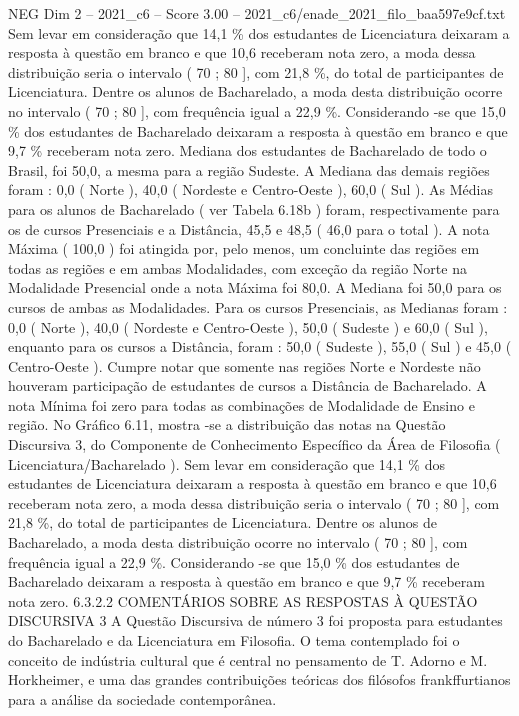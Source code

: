 \begin{textsample}{NEG Dim 2 – 2021\_c6 – Score 3.00 – 2021\_c6/enade\_2021\_filo\_baa597e9cf.txt}
Sem levar em consideração que 14,1 \% dos estudantes de Licenciatura deixaram a resposta à questão em branco e que 10,6 receberam nota zero, a moda dessa distribuição seria o intervalo ( 70 ; 80 ], com 21,8 \%, do total de participantes de Licenciatura.
Dentre os alunos de Bacharelado, a moda desta distribuição ocorre no intervalo ( 70 ; 80 ], com frequência igual a 22,9 \%.
Considerando -se que 15,0 \% dos estudantes de Bacharelado deixaram a resposta à questão em branco e que 9,7 \% receberam nota zero.
Mediana dos estudantes de Bacharelado de todo o Brasil, foi 50,0, a mesma para a região Sudeste.
A Mediana das demais regiões foram : 0,0 ( Norte ), 40,0 ( Nordeste e Centro-Oeste ), 60,0 ( Sul ).
As Médias para os alunos de Bacharelado ( ver Tabela 6.18b ) foram, respectivamente para os de cursos Presenciais e a Distância, 45,5 e 48,5 ( 46,0 para o total ).
A nota Máxima ( 100,0 ) foi atingida por, pelo menos, um concluinte das regiões em todas as regiões e em ambas Modalidades, com exceção da região Norte na Modalidade Presencial onde a nota Máxima foi 80,0.
A Mediana foi 50,0 para os cursos de ambas as Modalidades.
Para os cursos Presenciais, as Medianas foram : 0,0 ( Norte ), 40,0 ( Nordeste e Centro-Oeste ), 50,0 ( Sudeste ) e 60,0 ( Sul ), enquanto para os cursos a Distância, foram : 50,0 ( Sudeste ), 55,0 ( Sul ) e 45,0 ( Centro-Oeste ).
Cumpre notar que somente nas regiões Norte e Nordeste não houveram participação de estudantes de cursos a Distância de Bacharelado.
A nota Mínima foi zero para todas as combinações de Modalidade de Ensino e região.
No Gráfico 6.11, mostra -se a distribuição das notas na Questão Discursiva 3, do Componente de Conhecimento Específico da Área de Filosofia ( Licenciatura/Bacharelado ).
Sem levar em consideração que 14,1 \% dos estudantes de Licenciatura deixaram a resposta à questão em branco e que 10,6 receberam nota zero, a moda dessa distribuição seria o intervalo ( 70 ; 80 ], com 21,8 \%, do total de participantes de Licenciatura.
Dentre os alunos de Bacharelado, a moda desta distribuição ocorre no intervalo ( 70 ; 80 ], com frequência igual a 22,9 \%.
Considerando -se que 15,0 \% dos estudantes de Bacharelado deixaram a resposta à questão em branco e que 9,7 \% receberam nota zero. 6.3.2.2 COMENTÁRIOS SOBRE AS RESPOSTAS À QUESTÃO DISCURSIVA 3 A Questão Discursiva de número 3 foi proposta para estudantes do Bacharelado e da Licenciatura em Filosofia.
O tema contemplado foi o conceito de indústria cultural que é central no pensamento de T.
Adorno e M.
Horkheimer, e uma das grandes contribuições teóricas dos filósofos frankffurtianos para a análise da sociedade contemporânea.

\end{textsample}
